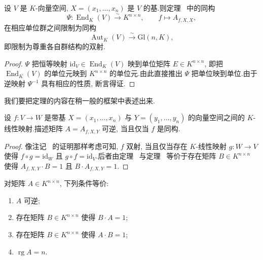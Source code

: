 \begin{theorem}\label{thm:3.3.5}
设 $V$ 是 $K$-向量空间, $X = (x_1, \ldots, x_n)$ 是 $V$ 的基.则定理~ 中的同构
\[
\varPsi \colon \operatorname{End}_K(V) \xrightarrow{\sim} K^{n \times n}, \qquad f \longmapsto A_{f, X, X},
\]
在相应单位群之间限制为同构
\[
\operatorname{Aut}_K(V) \xrightarrow{\sim} \mathrm{Gl}(n, K),
\]
即限制为尊重各自群结构的双射.
\end{theorem}

\begin{proof}
$\varPsi$ 把恒等映射 $\mathrm{id}_V \in \operatorname{End}_K(V)$ 映到单位矩阵 $E \in K^{n \times n}$, 即把 $\operatorname{End}_K(V)$ 的单位元映到 $K^{n \times n}$ 的单位元.由此直接推出 $\varPsi$ 把单位映到单位.由于逆映射 $\varPsi^{-1}$ 具有相应的性质, 断言得证.
\end{proof}

我们要把定理的内容在稍一般的框架中表述出来.

\begin{theorem}\label{thm:3.3.6}
设 $f \colon V \longrightarrow W$ 是带基 $X = (x_1, \ldots, x_n)$ 与 $Y = (y_1, \ldots, y_n)$ 的向量空间之间的 $K$-线性映射.描述矩阵 $A = A_{f, X, Y}$ 可逆, 当且仅当 $f$ 是同构.
\end{theorem}

\begin{proof}
像注记~ 的证明那样考虑可知, $f$ 双射, 当且仅当存在 $K$-线性映射 $g \colon W \longrightarrow V$ 使得 $f \circ g = \mathrm{id}_W$ 且 $g \circ f = \mathrm{id}_V$.后者由定理~ 与定理~ 等价于存在矩阵 $B \in K^{n \times n}$ 使得 $A_{f, X, Y} \cdot B = 1$ 且 $B \cdot A_{f, X, Y} = 1$.
\end{proof}

\begin{corollary}\label{cor:3.3.7}
对矩阵 $A \in K^{n \times n}$, 下列条件等价:
\begin{enumerate}
\item[(i)] $A$ 可逆;
\item[(ii)] 存在矩阵 $B \in K^{n \times n}$ 使得 $B \cdot A = 1$;
\item[(iii)] 存在矩阵 $B \in K^{n \times n}$ 使得 $A \cdot B = 1$;
\item[(iv)] $\operatorname{rg} A = n$.
\end{enumerate}
\end{corollary}

